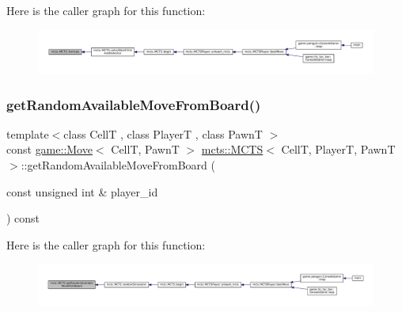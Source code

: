 Here is the caller graph for this function\+:
\nopagebreak
\begin{figure}[H]
\begin{center}
\leavevmode
\includegraphics[width=350pt]{classmcts_1_1_m_c_t_s_ac75ac1b12fbb40dca468f1c31a9fc8cd_icgraph}
\end{center}
\end{figure}
\mbox{\label{classmcts_1_1_m_c_t_s_a3e918b416dfe1e5155b077788936f137}} 
\subsubsection{\texorpdfstring{get\+Random\+Available\+Move\+From\+Board()}{getRandomAvailableMoveFromBoard()}}
{\footnotesize\ttfamily template$<$class CellT , class PlayerT , class PawnT $>$ \\
const \hyperlink{structgame_1_1_move}{game\+::\+Move}$<$ CellT, PawnT $>$ \hyperlink{classmcts_1_1_m_c_t_s}{mcts\+::\+M\+C\+TS}$<$ CellT, PlayerT, PawnT $>$\+::get\+Random\+Available\+Move\+From\+Board (\begin{DoxyParamCaption}\item[{const unsigned int \&}]{player\+\_\+id }\end{DoxyParamCaption}) const\hspace{0.3cm}{\ttfamily [protected]}}

Here is the caller graph for this function\+:
\nopagebreak
\begin{figure}[H]
\begin{center}
\leavevmode
\includegraphics[width=350pt]{classmcts_1_1_m_c_t_s_a3e918b416dfe1e5155b077788936f137_icgraph}
\end{center}
\end{figure}
\mbox{\label{classmcts_1_1_m_c_t_s_a6b5686f91610bb4f46c395634a17a5b8}} 
